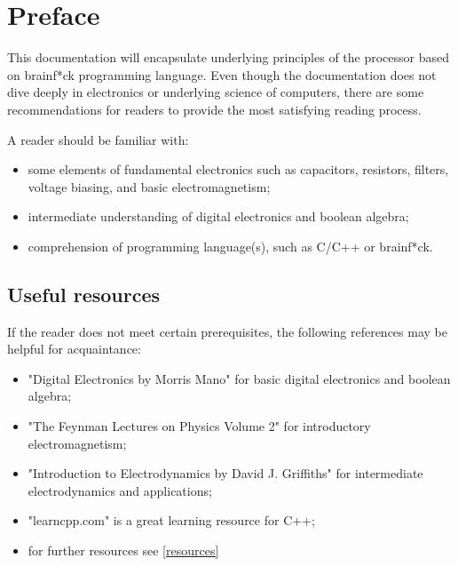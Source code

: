 \section{Preface} \label{sec:preface}
This documentation will encapsulate underlying principles of the processor based on brainf*ck programming language. Even though the documentation does not dive deeply in electronics or underlying science of computers, there are some recommendations for readers to provide the most satisfying reading process. 

A reader should be familiar with:
\begin{itemize}
	\item some elements of fundamental electronics such as capacitors, resistors, filters, voltage biasing, and basic electromagnetism;
	\item intermediate understanding of digital electronics and boolean algebra;
	\item comprehension of programming language(s), such as C/C++ or brainf*ck.
\end{itemize}

\subsection{Useful resources}
If the reader does not meet certain prerequisites, the following references may be helpful for acquaintance:
\begin{itemize}
	\item "Digital Electronics by Morris Mano" for basic digital electronics and boolean algebra;
	\item "The Feynman Lectures on Physics Volume 2" for introductory electromagnetism;
	\item "Introduction to Electrodynamics by David J. Griffiths" for intermediate electrodynamics and applications;
	\item "learncpp.com" is a great learning resource for C++;
	\item for further resources see \ref{resources}
\end{itemize}
